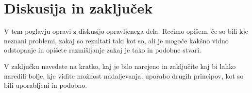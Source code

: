 \documentclass[pomnav, tisk, apa]{fppthesis}
\begin{document}
\newpage
\section{Diskusija in zaključek}
\label{sec:Diskusija}

V tem poglavju opravi z diskusijo opravljenega dela. Recimo opišem, če so bili kje neznani problemi, zakaj so rezultati taki kot so, ali je mogoče kakšno vidno odstopanje in opišete razmišljanje zakaj je tako in podobne stvari.

V zaključku navedete na kratko, kaj je bilo narejeno in zaključite kaj bi lahko naredili bolje, kje vidite možnost nadaljevanja, uporabo drugih principov, kot so bili uporabljeni in podobno.



\cleardoublepage
\singlespacing
{}
\printbibliography
\end{document}
